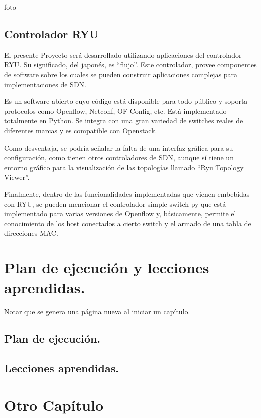 \documentclass[12pt,a4paper,oneside]{book}
\begin{document}
foto



\section{Controlador RYU}
\label{marco_ryu}

El presente Proyecto será desarrollado utilizando aplicaciones del controlador RYU. Su significado, del japonés, es “flujo”. Este controlador, provee componentes de software sobre los cuales se pueden construir aplicaciones complejas para implementaciones de SDN. 

Es un software abierto cuyo código está disponible para todo público y soporta protocolos como Openflow, Netconf, OF-Config, etc. Está implementado totalmente en Python. Se integra con una gran variedad de switches reales de diferentes marcas y es compatible con Openstack.

Como desventaja, se podría señalar la falta de una interfaz gráfica para su configuración, como tienen otros controladores de SDN, aunque sí tiene un entorno gráfico para la visualización de las topologías llamado “Ryu Topology Viewer”.

Finalmente, dentro de las funcionalidades implementadas que vienen embebidas con RYU, se pueden mencionar el controlador simple switch py que está implementado para varias versiones de Openflow y, básicamente, permite el conocimiento de los host conectados a cierto switch y el armado de una tabla de direcciones MAC.

\chapter{Plan de ejecución y lecciones aprendidas.}
\label{plan_aprendizaje_ejecucion}

Notar que se genera una página nueva al iniciar un capítulo.

\section{Plan de ejecución.}

\section{Lecciones aprendidas.}

\chapter{Otro Capítulo}
\end{document}
